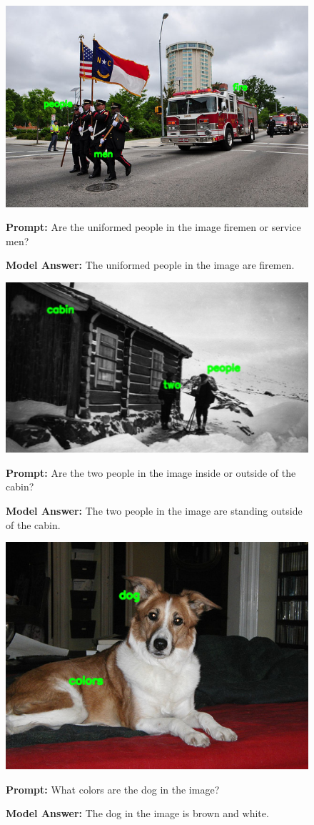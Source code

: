 \documentclass[11pt]{article}
\begin{document}
\begin{figure}[H]
    \centering
    \includegraphics[width=0.6\linewidth]{iclr2026/reordering_383.png}\par
    \vspace{1em}
    \raggedright
    \textbf{Prompt:} Are the uniformed people in the image firemen or service men?
    
    \textbf{Model Answer:} The uniformed people in the image are firemen.
\end{figure}



\begin{figure}[H]
    \centering
    \includegraphics[width=0.6\linewidth]{iclr2026/reordering_15.png}\par
    \vspace{1em}
    \raggedright
    \textbf{Prompt:} Are the two people in the image inside or outside of the cabin?
    
    \textbf{Model Answer:} The two people in the image are standing outside of the cabin.
    \label{fig:qwen_loss_plot}
\end{figure}

\begin{figure}[H]
    \centering
    \includegraphics[width=0.6\linewidth]{iclr2026/reordering_230.png}\par
    \vspace{1em}
    \raggedright
    \textbf{Prompt:} What colors are the dog in the image?
    
    \textbf{Model Answer:} The dog in the image is brown and white.
\end{figure}
\end{document}
